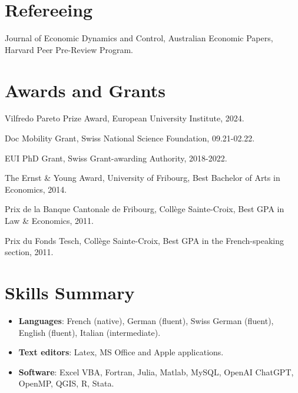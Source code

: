 \documentclass[letterpaper,11pt]{article}
\makeatletter
\newcommand{\resumeItem}[2]{
  \item\small{
    \textbf{#1}{: #2 \vspace{-2pt}}
  }
}
\newcommand{\resumeSubheading}[4]{
  \vspace{-1pt}\item
    \begin{tabular*}{0.97\textwidth}{l@{\extracolsep{\fill}}r}
      \textbf{#1} & #2 \\
      \textit{\small#3} & \textit{\small #4} \\
    \end{tabular*}\vspace{-5pt}
}
\newcommand{\resumeSubItem}[2]{\resumeItem{#1}{#2}\vspace{-1pt}}
\newcommand{\resumeSubHeadingListStart}{\begin{itemize}[leftmargin=*]}
\newcommand{\resumeSubHeadingListEnd}{\end{itemize}}
\makeatother
\begin{document}
      
      
      
      


\section{Refereeing}
\begin{description}[font=$\bullet$]
\item {Journal of Economic Dynamics and Control, Australian Economic Papers, Harvard Peer Pre-Review Program.} 
\end{description}

\section{Awards and Grants}
\begin{description}[font=$\bullet$]
\item {Vilfredo Pareto Prize Award, European University Institute, 2024.} 
\item {Doc Mobility Grant, Swiss National Science Foundation, 09.21-02.22.} 
\item {EUI PhD Grant, Swiss Grant-awarding Authority, 2018-2022.} 
\item {The Ernst \& Young Award, University of Fribourg, Best Bachelor of Arts in Economics, 2014.} 
\item {Prix de la Banque Cantonale de Fribourg, Coll\`{e}ge Sainte-Croix, Best GPA in Law \& Economics, 2011.}
\item {Prix du Fonds Tesch, Coll\`{e}ge Sainte-Croix, Best GPA in the French-speaking section, 2011.}
\end{description}


%
\section{Skills Summary}
	\resumeSubHeadingListStart
	\resumeSubItem{Languages}{French (native), German (fluent), Swiss German (fluent), English (fluent), Italian (intermediate).}
	\resumeSubItem{Text editors}{Latex, MS Office and Apple applications.}
	\resumeSubItem{Software}{Excel VBA, Fortran, Julia, Matlab, MySQL, OpenAI ChatGPT, OpenMP, QGIS, R, Stata.}
\resumeSubHeadingListEnd

\end{document}

